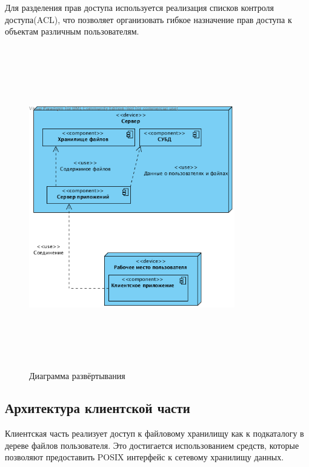 \documentclass[utf8,usehyperref,12pt]{G7-32}
\begin{document}
Для разделения прав доступа используется реализация списков контроля доступа(ACL)\cite{wiki_acl}, что позволяет организовать гибкое назначение прав доступа к объектам различным пользователям. 

\begin{figure}[ht]
   \centering%
   \includegraphics[height=140mm, width=0.8\textwidth, clip, keepaspectratio]{pictures/Deploy}
   \caption{Диаграмма развёртывания}\label{fig:deploy}
 \end{figure}
 
 
\subsection{Архитектура клиентской части}

Клиентская часть реализует доступ к файловому хранилищу как к подкаталогу в дереве файлов пользователя. Это достигается использованием средств, которые позволяют предоставить POSIX интерфейс к сетевому хранилищу данных.
\end{document}

